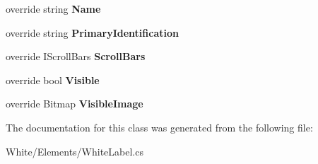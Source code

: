 \begin{DoxyCompactItemize}
\item 
\hypertarget{class_proto_test_1_1_golem_1_1_white_1_1_elements_1_1_white_label_a7d06f67b33c5b0a88101f1414818e938}{override string {\bfseries Name}}\label{class_proto_test_1_1_golem_1_1_white_1_1_elements_1_1_white_label_a7d06f67b33c5b0a88101f1414818e938}

\item 
\hypertarget{class_proto_test_1_1_golem_1_1_white_1_1_elements_1_1_white_label_a9594a7020b7126e698c10a2312cf2585}{override string {\bfseries Primary\-Identification}}\label{class_proto_test_1_1_golem_1_1_white_1_1_elements_1_1_white_label_a9594a7020b7126e698c10a2312cf2585}

\item 
\hypertarget{class_proto_test_1_1_golem_1_1_white_1_1_elements_1_1_white_label_ab8bc2860300c23fa78de6bc293ac7edd}{override I\-Scroll\-Bars {\bfseries Scroll\-Bars}}\label{class_proto_test_1_1_golem_1_1_white_1_1_elements_1_1_white_label_ab8bc2860300c23fa78de6bc293ac7edd}

\item 
\hypertarget{class_proto_test_1_1_golem_1_1_white_1_1_elements_1_1_white_label_afff162f527d5551853ed5973affaa505}{override bool {\bfseries Visible}}\label{class_proto_test_1_1_golem_1_1_white_1_1_elements_1_1_white_label_afff162f527d5551853ed5973affaa505}

\item 
\hypertarget{class_proto_test_1_1_golem_1_1_white_1_1_elements_1_1_white_label_a03bde5551e38f9c8a33d6d220125bbb6}{override Bitmap {\bfseries Visible\-Image}}\label{class_proto_test_1_1_golem_1_1_white_1_1_elements_1_1_white_label_a03bde5551e38f9c8a33d6d220125bbb6}

\end{DoxyCompactItemize}


The documentation for this class was generated from the following file\-:\begin{DoxyCompactItemize}
\item 
White/\-Elements/White\-Label.\-cs\end{DoxyCompactItemize}
